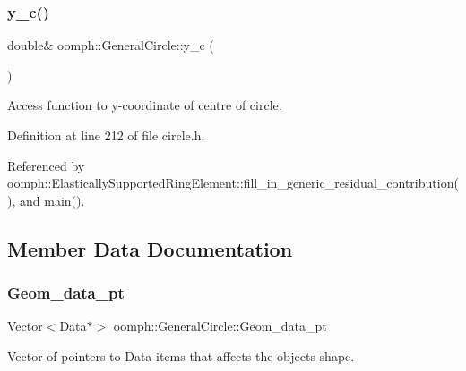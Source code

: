 \mbox{\label{classoomph_1_1GeneralCircle_afa91b6356920d73e05f81d6e7aaf0bf7}} 
\subsubsection{\texorpdfstring{y\+\_\+c()}{y\_c()}}
{\footnotesize\ttfamily double\& oomph\+::\+General\+Circle\+::y\+\_\+c (\begin{DoxyParamCaption}{ }\end{DoxyParamCaption})\hspace{0.3cm}{\ttfamily [inline]}}



Access function to y-\/coordinate of centre of circle. 



Definition at line 212 of file circle.\+h.



Referenced by oomph\+::\+Elastically\+Supported\+Ring\+Element\+::fill\+\_\+in\+\_\+generic\+\_\+residual\+\_\+contribution(), and main().



\subsection{Member Data Documentation}
\mbox{\label{classoomph_1_1GeneralCircle_a4a707f37b32d447dbe965177e442aa76}} 
\subsubsection{\texorpdfstring{Geom\+\_\+data\+\_\+pt}{Geom\_data\_pt}}
{\footnotesize\ttfamily Vector$<$Data$\ast$$>$ oomph\+::\+General\+Circle\+::\+Geom\+\_\+data\+\_\+pt\hspace{0.3cm}{\ttfamily [protected]}}



Vector of pointers to Data items that affects the object\textquotesingle{}s shape. 




